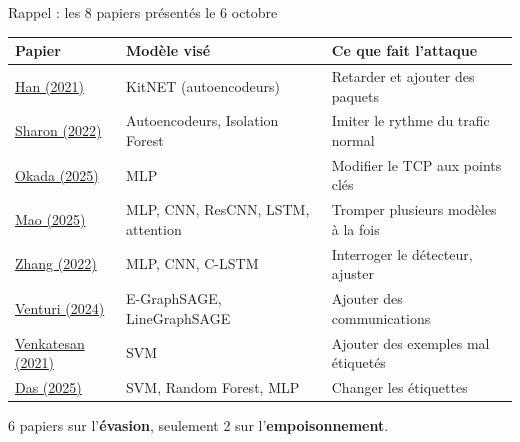 \documentclass[aspectratio=169,11pt,xcolor=table]{beamer}
\begin{document}
\begin{frame}{Rappel : les 8 papiers présentés le 6 octobre}
  \small
  \renewcommand{\arraystretch}{1.3}
  \begin{tabularx}{\linewidth}{@{}>{\raggedright\arraybackslash}p{.2\linewidth}>{\raggedright\arraybackslash}p{.36\linewidth}>{\raggedright\arraybackslash}X@{}}
    \toprule
    \textbf{Papier} & \textbf{Modèle visé} & \textbf{Ce que fait l'attaque} \\
    \midrule
    \href{https://doi.org/10.1109/JSAC.2021.3087242}{Han (2021)} & KitNET (autoencodeurs) & Retarder et ajouter des paquets \\
    \href{https://doi.org/10.1109/TIFS.2022.3201377}{Sharon (2022)} & Autoencodeurs, Isolation Forest & Imiter le rythme du trafic normal \\
    \href{https://doi.org/10.1007/s10207-025-01016-0}{Okada (2025)} & MLP & Modifier le TCP aux points clés \\
    \href{https://doi.org/10.1016/j.jnca.2025.104255}{Mao (2025)} & MLP, CNN, ResCNN, LSTM, attention & Tromper plusieurs modèles à la fois \\
    \href{https://doi.org/10.1109/TNET.2021.3137084}{Zhang (2022)} & MLP, CNN, C-LSTM & Interroger le détecteur, ajuster \\
    \href{https://arxiv.org/abs/2403.11830}{Venturi (2024)} & E-GraphSAGE, LineGraphSAGE & Ajouter des communications \\
    \midrule
    \href{https://doi.org/10.1109/MILCOM52596.2021.9652916}{Venkatesan (2021)} & SVM & Ajouter des exemples mal étiquetés \\
    \href{https://doi.org/10.1109/TNSE.2024.3492032}{Das (2025)} & SVM, Random Forest, MLP & Changer les étiquettes \\
    \bottomrule
  \end{tabularx}
  \vfill
  \normalsize
  6 papiers sur l'\textbf{évasion}, seulement 2 sur l'\textbf{empoisonnement}.
\end{frame}
\end{document}
